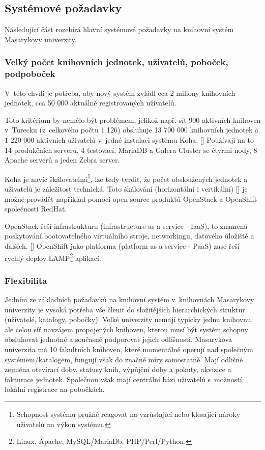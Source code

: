 \documentclass[
	11pt, oneside, printed, final, palatino, monochrome
	microtype,
	table,   %
	lof,     %
	lot     %
]{fithesis3}
\newcommand{\citepages}[2]{[\cite[#1]{#2}]}
\newcommand{\citesource}[1]{[\cite{#1}]}
\begin{document}
{\subsection{Systémové požadavky} \label{sec:systemove_pozadavky}
Následující část rozebírá hlavní systémové požadavky na knihovní systém Masarykovy univerzity.

\subsubsection{Velký počet knihovních jednotek, uživatelů, poboček, podpoboček}
V~této chvíli je potřeba, aby nový systém zvládl cca 2 miliony knihovních jednotek, cca 50 000 aktuálně registrovaných  uživatelů.

Toto kritérium by nemělo být problémem, jelikož např. síť 900 aktivních knihoven v~Turecku (z~celkového počtu 1 126) obsluhuje 13 700 000 knihovních jednotek a 1 220 000 aktivních uživatelů v~jedné instalaci systému Koha. \citesource{koha_komunita_2016}
 Používají na to 14 produkčních serverů, 4 testovací, MariaDB a Galera Cluster se čtyrmi nody, 8 Apache serverů a jeden Zebra server. 

Koha je navíc škálovatelná\footnote{Schopnost systému pružně reagovat na vzrůstající nebo klesající nároky uživatelů na výkon systému.}, lze tedy tvrdit, že počet obsloužených jednotek a uživatelů je záležitost technická. Toto škálování (horizontální i vertikální) \citepages{1-4}{6847479} je možné provádět například pomocí open source produktů OpenStack a OpenShift společnosti RedHat. 

OpenStack řeší infrastrukturu (infrastructure as a service - IaaS), to znamená poskytování bootovatelného virtuálního stroje, networkingu, datového úložiště a dalších. \citepages{14-16}{breeding_2012} OpenShift jako platforma (platform as a service - PaaS) zase řeší rychlý deploy LAMP\footnote{Linux, Apache, MySQL/MariaDb, PHP/Perl/Python.} aplikací.

\subsubsection{Flexibilita}
Jedním ze základních požadavků na knihovní systém v~knihovnách Masarykovy univerzity je vysoká potřeba vše členit do složitějších hierarchických struktur (uživatelé, katalogy, pobočky). Velké univerzity nemají typicky jednu knihovnu, ale celou síť navzájem propojených knihoven, kterou musí být systém schopny obsluhovat jednotně a současně podporovat jejich odlišnosti. Masarykova univerzita má 10 fakultních knihoven, které momentálně operují nad společným systémem/katalogem, fungují však do značné míry samostatně. Mají odlišné zejména otevírací doby, statusy knih, výpůjční doby a pokuty, akvizice a fakturace jednotek. Společnou však mají centrální bázi uživatelů s~možností lokální registrace na pobočkách. 

}
\end{document}
